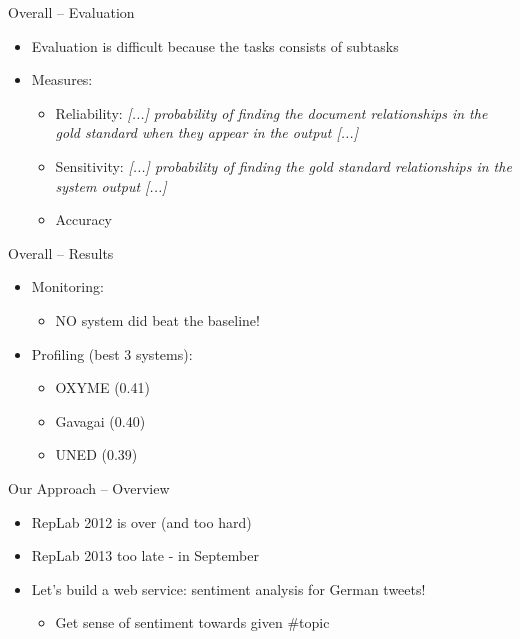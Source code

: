 \documentclass[12pt,a4paper]{beamer}
\begin{document}
\begin{frame}{Overall -- Evaluation}
\begin{itemize}
\item Evaluation is difficult because the tasks consists of subtasks
\item Measures:
\begin{itemize}
\item Reliability: \textit{[...] probability of finding the document relationships in the gold standard when they appear in the output [...]} \cite{amigo}
\item Sensitivity: \textit{[...] probability of finding the gold standard relationships in the system output [...]} \cite{amigo}
\item Accuracy
\end{itemize}
\end{itemize}
\end{frame}


\begin{frame}{Overall -- Results}
\begin{itemize}
\item Monitoring:
\begin{itemize}
\item NO system did beat the baseline!
\end{itemize}
\item Profiling (best 3 systems):
\begin{itemize}
\item OXYME (0.41)
\item Gavagai (0.40)
\item UNED (0.39)
\end{itemize}
\end{itemize}
\end{frame}

\begin{frame}{Our Approach -- Overview}
\begin{itemize}
\item RepLab 2012 is over (and too hard)
\item RepLab 2013 too late - in September
\item Let's build a web service: sentiment analysis for German tweets!
  \begin{itemize}
  \item Get sense of sentiment towards given \#topic
  \end{itemize}
\end{itemize}
\end{frame}
\end{document}
